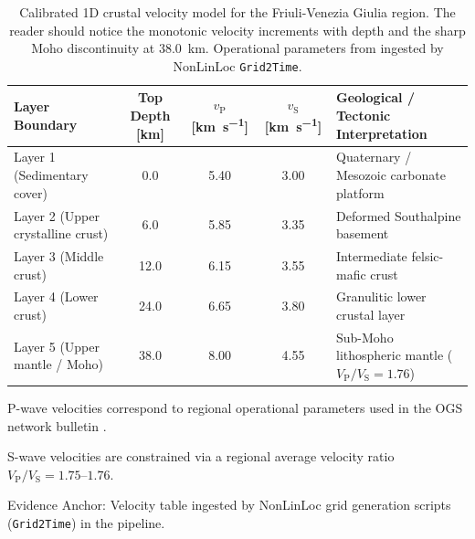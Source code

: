 \begin{table}[htbp]
  \centering
  \small
  \caption{Calibrated 1D crustal velocity model for the
    Friuli-Venezia Giulia region. The reader should notice the monotonic
    velocity increments with depth and the sharp Moho discontinuity at
    \qty{38.0}{\kilo\meter}. Operational parameters from \textcite{SMINO}
  ingested by \ac{NonLinLoc} \texttt{Grid2Time}.}
  \label{tab:velocity_model}
  \begin{threeparttable}
    \begin{tabularx}{\linewidth}{l c c c >{\raggedright\arraybackslash}X}
      \toprule
      \textbf{Layer Boundary} & \textbf{Top Depth} [\unit{\kilo\meter}] &
      $v_{\mathrm{P}}$ [\unit{\kilo\meter\per\second}]\tnote{a} &
      $v_{\mathrm{S}}$
      [\unit{\kilo\meter\per\second}]\tnote{b} & \textbf{Geological / Tectonic
      Interpretation} \\
      \midrule
      Layer 1 (Sedimentary cover) & \num{0.0} & \num{5.40} & \num{3.00} &
      Quaternary / Mesozoic carbonate platform \\
      Layer 2 (Upper crystalline crust) & \num{6.0} & \num{5.85} & \num{3.35} &
      Deformed Southalpine basement \\
      Layer 3 (Middle crust) & \num{12.0} & \num{6.15} & \num{3.55} &
      Intermediate felsic-mafic crust \\
      Layer 4 (Lower crust) & \num{24.0} & \num{6.65} & \num{3.80} &
      Granulitic lower crustal layer \\
      Layer 5 (Upper mantle / Moho) & \num{38.0} & \num{8.00} & \num{4.55} &
      Sub-Moho lithospheric mantle ($V_{\mathrm{P}}/V_{\mathrm{S}} =
      \num{1.76}$) \\
      \bottomrule
    \end{tabularx}
    \begin{tablenotes}[flushleft]
      \footnotesize
    \item[a] P-wave velocities correspond to regional operational
      parameters used in the \ac{OGS} network bulletin \parencite{SMINO}.
    \item[b] S-wave velocities are constrained via a regional
      average velocity ratio $V_{\mathrm{P}}/V_{\mathrm{S}} =
      \numrange{1.75}{1.76}$.
    \item Evidence Anchor: Velocity table ingested by \ac{NonLinLoc} grid
      generation scripts (\texttt{Grid2Time}) in the pipeline.
    \end{tablenotes}
  \end{threeparttable}
\end{table}

